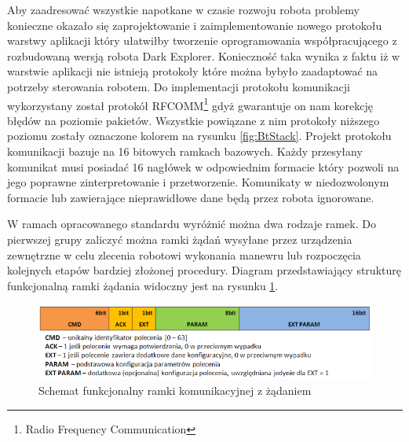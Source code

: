 Aby zaadresować wszystkie napotkane w czasie rozwoju robota problemy konieczne
okazało się zaprojektowanie i zaimplementowanie nowego protokołu warstwy
aplikacji który ułatwiłby tworzenie oprogramowania współpracującego z rozbudowaną
wersją robota Dark Explorer. Konieczność taka wynika z faktu iż w warstwie
aplikacji nie istnieją protokoły które można bybyło zaadaptować na potrzeby
sterowania robotem.  Do implementacji protokołu komunikacji wykorzystany został
protokół RFCOMM\footnote{Radio Frequency Communication} gdyż gwarantuje on nam
korekcję błędów na poziomie pakietów. Wszystkie powiązane z nim protokoły
niższego poziomu zostały oznaczone kolorem na rysunku \ref{fig:BtStack}. Projekt
protokołu komunikacji bazuje na 16 bitowych ramkach bazowych. Każdy przesyłany
komunikat musi posiadać 16 nagłówek w odpowiednim formacie który pozwoli na jego
poprawne zinterpretowanie i przetworzenie. Komunikaty w niedozwolonym formacie
lub zawierające nieprawidłowe dane będą przez robota ignorowane.

W ramach opracowanego standardu wyróżnić można dwa rodzaje ramek. Do pierwszej grupy
zaliczyć można ramki żądań wysyłane przez urządzenia zewnętrzne w celu zlecenia
robotowi wykonania manewru lub rozpoczęcia kolejnych etapów bardziej złożonej
procedury. Diagram przedstawiający strukturę funkcjonalną ramki żądania widoczny
jest na rysunku \ref{fig:RfcommReqFrame}.

\begin{figure}[h!] 
 \centering
 \includegraphics[width=\textwidth]{../images/ch05/req_schema2.png}
 \caption{Schemat funkcjonalny ramki komunikacyjnej z żądaniem}
 \label{fig:RfcommReqFrame}
\end{figure}

